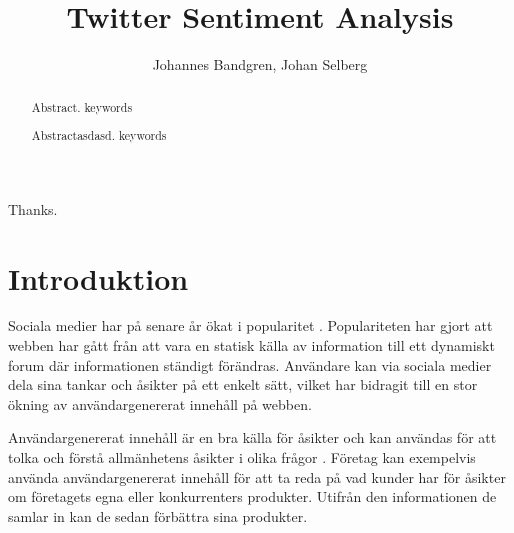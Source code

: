 \documentclass{kaumasters} %
\title{Twitter Sentiment Analysis}
\author{Johannes Bandgren, Johan Selberg}
\institute{Department of Computer Science}
\begin{document}



\maketitle

\frontmatter
\approvalpage%

\begin{abstract}
  Abstract.
  \keywords keywords
\end{abstract}

\begin{abstract}
  Abstractasdasd.
  \keywords keywords
\end{abstract}




\begin{acknowledgements}
  Thanks.
\end{acknowledgements}

\tableofcontents{}
\listoffigures
\listoftables
\lstlistoflistings

\mainmatter
\pagestyle{fancy}
\fancyhead[LE,RO]{\thepage}
\fancyhead[RE,LO]{\rightmark}
\fancyfoot{}
\chapter{Introduktion}
Sociala medier har på senare år ökat i popularitet \cite{TSAsurvey}. Populariteten har gjort att webben har gått från att vara en statisk källa av information till ett dynamiskt forum där informationen ständigt förändras. Användare kan via sociala medier dela sina tankar och åsikter på ett enkelt sätt, vilket har bidragit till en stor ökning av användargenererat innehåll på webben. 

Användargenererat innehåll är en bra källa för åsikter och kan användas för att tolka och förstå allmänhetens åsikter i olika frågor \cite{TSAsurvey}. Företag kan exempelvis använda användargenererat innehåll för att ta reda på vad kunder har för åsikter om företagets egna eller konkurrenters produkter. Utifrån den informationen de samlar in kan de sedan förbättra sina produkter.
\end{document}
